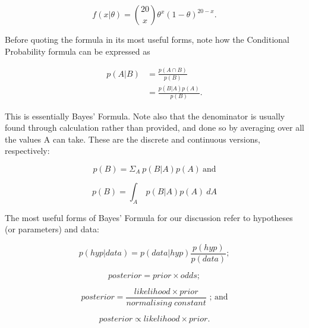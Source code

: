 \documentclass{article}
\begin{document}
\begin{equation}
    f(x|\theta) = \binom{20}{x}  \theta^x (1-\theta)^{20-x}. \label{Binomial_20}
\end{equation}

Before quoting the formula in its most useful forms, note how the Conditional Probability formula can be expressed as

\begin{equation}
\begin{split}
        p(A|B)
        &=\frac{p(A\cap B)}{p(B)} \\
        &=\frac{p(B|A)p(A)}{p(B)}. \label{BayesVanilla}
\end{split}
\end{equation}

\newpage

This is essentially Bayes' Formula. Note also that the denominator is usually found through calculation rather than provided, and done so by averaging over all the values A can take. These are the discrete and continuous versions, respectively:

\begin{equation}
    p(B)=\Sigma_A \ p(B|A)p(A) \ \text{and}
\end{equation}

\begin{equation}
    p(B)=\int_A \ p(B|A)p(A) \ dA \label{normalising_constant}
\end{equation}

The most useful forms of Bayes' Formula for our discussion refer to hypotheses (or parameters) and data:

\begin{equation}
    {p(hyp|data)=p(data|hyp)\frac{p(hyp)}{p(data)}};
\end{equation}

\begin{equation}
    posterior = prior \times odds; 
\end{equation}

\begin{equation}
    posterior = \frac{likelihood \times prior}{normalising \; constant} \text{\ ; and}
\end{equation}

\begin{equation}
    posterior \propto likelihood \times prior.
\end{equation}

\vspace{5mm}
\end{document}
